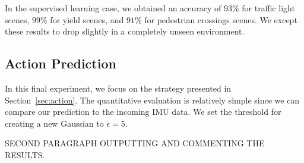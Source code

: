 In the supervised learning case, we obtained an accuracy of $93\%$ for traffic
light scenes, $99\%$ for yield scenes, and $91\%$ for pedestrian crossings
scenes. We except these results to drop slightly in a completely unseen
environment.

\subsection{Action Prediction}
In this final experiment, we focus on the strategy presented in
Section~\ref{sec:action}. The quantitative evaluation is relatively simple since
we can compare our prediction to the incoming IMU data. We set the threshold for
creating a new Gaussian to $\epsilon=5$.

SECOND PARAGRAPH OUTPUTTING AND COMMENTING THE RESULTS.
